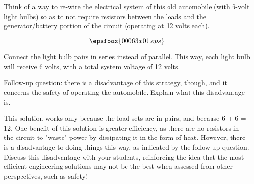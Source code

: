 

Think of a way to re-wire the electrical system of this old automobile (with 6-volt light bulbs) so as to not require resistors between the loads and the generator/battery portion of the circuit (operating at 12 volts each).

$$\epsfbox{00063x01.eps}$$







Connect the light bulb pairs in series instead of parallel.  This way, each light bulb will receive 6 volts, with a total system voltage of 12 volts.

\vskip 10pt

Follow-up question: there is a disadvantage of this strategy, though, and it concerns the safety of operating the automobile.  Explain what this disadvantage is.







This solution works only because the load sets are in pairs, and because 6 + 6 = 12.  One benefit of this solution is greater efficiency, as there are no resistors in the circuit to "waste" power by dissipating it in the form of heat.  However, there is a disadvantage to doing things this way, as indicated by the follow-up question.  Discuss this disadvantage with your students, reinforcing the idea that the most efficient engineering solutions may not be the best when assessed from other perspectives, such as safety!




